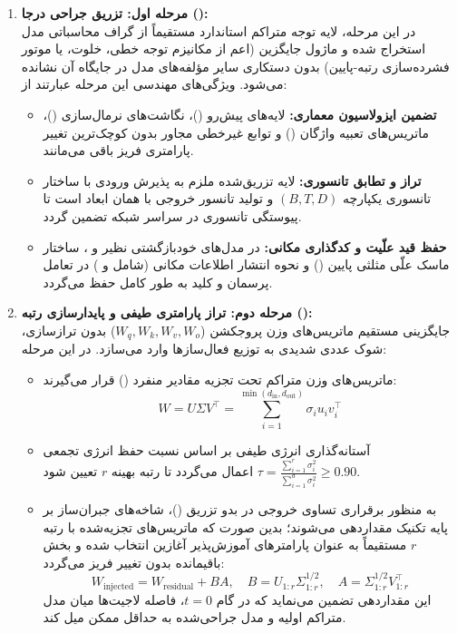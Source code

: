 \documentclass[12pt,a4paper]{report}
\theoremstyle{definition}
\begin{document}
\begin{enumerate}
    \item \textbf{مرحله اول: تزریق جراحی درجا ():} \\
    در این مرحله، لایه توجه متراکم استاندارد مستقیماً از گراف محاسباتی مدل استخراج شده و ماژول جایگزین (اعم از مکانیزم توجه خطی، خلوت، یا موتور فشرده‌سازی رتبه-پایین) بدون دستکاری سایر مؤلفه‌های مدل در جایگاه آن نشانده می‌شود. ویژگی‌های مهندسی این مرحله عبارتند از:
    \begin{itemize}
        \item \textbf{تضمین ایزولاسیون معماری:} لایه‌های پیش‌رو ()، نگاشت‌های نرمال‌سازی ()، ماتریس‌های تعبیه واژگان () و توابع غیرخطی مجاور بدون کوچک‌ترین تغییر پارامتری فریز باقی می‌مانند.
        \item \textbf{تراز و تطابق تانسوری:} لایه تزریق‌شده ملزم به پذیرش ورودی با ساختار تانسوری یکپارچه $(B, T, D)$ و تولید تانسور خروجی با همان ابعاد است تا پیوستگی تانسوری در سراسر شبکه تضمین گردد.
        \item \textbf{حفظ قید علّیت و کدگذاری مکانی:} در مدل‌های خودبازگشتی نظیر  و ، ساختار ماسک علّی مثلثی پایین () و نحوه انتشار اطلاعات مکانی (شامل  و ) در تعامل پرسمان و کلید به طور کامل حفظ می‌گردد.
    \end{itemize}

    \item \textbf{مرحله دوم: تراز پارامتری طیفی و پایدارسازی رتبه ():} \\
    جایگزینی مستقیم ماتریس‌های وزن پروجکشن ($W_q, W_k, W_v, W_o$) بدون ترازسازی، شوک عددی شدیدی به توزیع فعال‌سازها وارد می‌سازد. در این مرحله:
    \begin{itemize}
        \item ماتریس‌های وزن متراکم تحت تجزیه مقادیر منفرد () قرار می‌گیرند:
        \begin{equation}
            W = U \Sigma V^\top = \sum_{i=1}^{\min(d_{\text{in}}, d_{\text{out}})} \sigma_i u_i v_i^\top
        \end{equation}
        \item آستانه‌گذاری انرژی طیفی بر اساس نسبت حفظ انرژی تجمعی $\tau = \frac{\sum_{i=1}^r \sigma_i^2}{\sum_{i=1}^d \sigma_i^2} \ge 0.90$ اعمال می‌گردد تا رتبه بهینه $r$ تعیین شود.
        \item به منظور برقراری تساوی خروجی در بدو تزریق ()، شاخه‌های جبران‌ساز بر پایه تکنیک  مقداردهی می‌شوند؛ بدین صورت که ماتریس‌های تجزیه‌شده با رتبه $r$ مستقیماً به عنوان پارامترهای آموزش‌پذیر آغازین انتخاب شده و بخش باقیمانده بدون تغییر فریز می‌گردد:
        \begin{equation}
            W_{\text{injected}} = W_{\text{residual}} + B A, \quad B = U_{1:r} \Sigma_{1:r}^{1/2}, \quad A = \Sigma_{1:r}^{1/2} V_{1:r}^\top
        \end{equation}
        این مقداردهی تضمین می‌نماید که در گام $t=0$، فاصله لاجیت‌ها میان مدل متراکم اولیه و مدل جراحی‌شده به حداقل ممکن میل کند.
    \end{itemize}


\end{enumerate}
\end{document}
